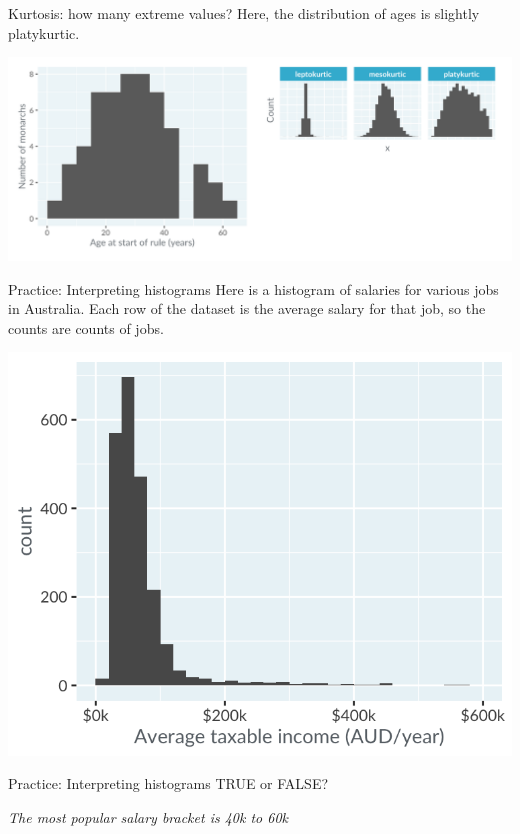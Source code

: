 \documentclass[
  ignorenonframetext,
]{beamer}
\begin{document}
\begin{frame}{Kurtosis: how many extreme values?}
\label{kurtosis-how-many-extreme-values-2}
Here, the distribution of ages is slightly platykurtic.

\includegraphics{../images/im15.png}
\end{frame}

\begin{frame}{Practice: Interpreting histograms}
\label{practice-interpreting-histograms}
Here is a histogram of salaries for various jobs in Australia. Each row
of the dataset is the average salary for that job, so the counts are
counts of jobs.

\includegraphics{../images/im16.png}
\end{frame}

\begin{frame}{Practice: Interpreting histograms}
\label{practice-interpreting-histograms-1}
TRUE or FALSE?

\emph{The most popular salary bracket is 40k to 60k}
\end{frame}
\end{document}
